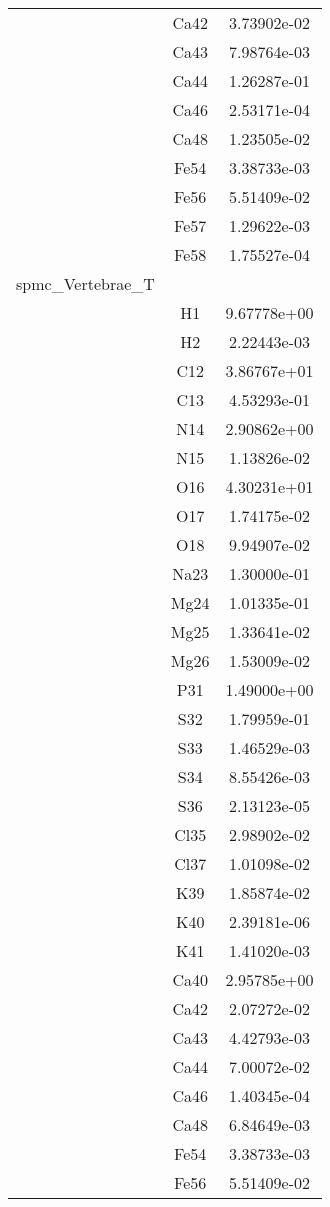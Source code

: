 \begin{centering}
\begin{longtable}{l c c}
& Ca42 & 3.73902e-02 \\ 
& Ca43 & 7.98764e-03 \\ 
& Ca44 & 1.26287e-01 \\ 
& Ca46 & 2.53171e-04 \\ 
& Ca48 & 1.23505e-02 \\ 
& Fe54 & 3.38733e-03 \\ 
& Fe56 & 5.51409e-02 \\ 
& Fe57 & 1.29622e-03 \\ 
& Fe58 & 1.75527e-04 \\ 
\hline
spmc\_Vertebrae\_T & & \\
\hline
& H1 & 9.67778e+00 \\ 
& H2 & 2.22443e-03 \\ 
& C12 & 3.86767e+01 \\ 
& C13 & 4.53293e-01 \\ 
& N14 & 2.90862e+00 \\ 
& N15 & 1.13826e-02 \\ 
& O16 & 4.30231e+01 \\ 
& O17 & 1.74175e-02 \\ 
& O18 & 9.94907e-02 \\ 
& Na23 & 1.30000e-01 \\ 
& Mg24 & 1.01335e-01 \\ 
& Mg25 & 1.33641e-02 \\ 
& Mg26 & 1.53009e-02 \\ 
& P31 & 1.49000e+00 \\ 
& S32 & 1.79959e-01 \\ 
& S33 & 1.46529e-03 \\ 
& S34 & 8.55426e-03 \\ 
& S36 & 2.13123e-05 \\ 
& Cl35 & 2.98902e-02 \\ 
& Cl37 & 1.01098e-02 \\ 
& K39 & 1.85874e-02 \\ 
& K40 & 2.39181e-06 \\ 
& K41 & 1.41020e-03 \\ 
& Ca40 & 2.95785e+00 \\ 
& Ca42 & 2.07272e-02 \\ 
& Ca43 & 4.42793e-03 \\ 
& Ca44 & 7.00072e-02 \\ 
& Ca46 & 1.40345e-04 \\ 
& Ca48 & 6.84649e-03 \\ 
& Fe54 & 3.38733e-03 \\ 
& Fe56 & 5.51409e-02 \\ 

\end{longtable}
\end{centering}
